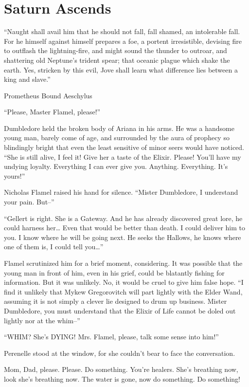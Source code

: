 \chapter{Saturn Ascends}

“Naught shall avail him that he should not fall, fall shamed, an intolerable fall. For he himself against himself prepares a foe, a portent irresistible, devising fire to outflash the lightning-fire, and might sound the thunder to outroar, and shattering old Neptune’s trident spear; that oceanic plague which shake the earth. Yes, stricken by this evil, Jove shall learn what difference lies between a king and slave.”

Prometheus Bound
Aeschylus
\simpleline
{}

“Please, Master Flamel, please!”

Dumbledore held the broken body of Ariana in his arms. He was a handsome young man, barely come of age, and surrounded by the aura of prophecy so blindingly bright that even the least sensitive of minor seers would have noticed. “She is still alive, I feel it! Give her a taste of the Elixir. Please! You’ll have my undying loyalty. Everything I can ever give you. Anything. Everything. It’s yours!”

Nicholas Flamel raised his hand for silence. “Mister Dumbledore, I understand your pain. But–”

“Gellert is right. She is a Gateway. And he has already discovered great lore, he could harness her… Even that would be better than death. I could deliver him to you. I know where he will be going next. He seeks the Hallows, he knows where one of them is, I could tell you…”

Flamel scrutinized him for a brief moment, considering. It was possible that the young man in front of him, even in his grief, could be blatantly fishing for information. But it was unlikely. No, it would be cruel to give him false hope. “I find it unlikely that Mykew Gregorovitch will part lightly with the Elder Wand, assuming it is not simply a clever lie designed to drum up business. Mister Dumbledore, you must understand that the Elixir of Life cannot be doled out lightly nor at the whim–”

“WHIM? She’s DYING! Mrs. Flamel, please, talk some sense into him!”

Perenelle stood at the window, for she couldn’t bear to face the conversation.

Mom, Dad, please. Please. Do something. You’re healers. She’s breathing now, look she’s breathing now. The water is gone, now do something. Do something!

